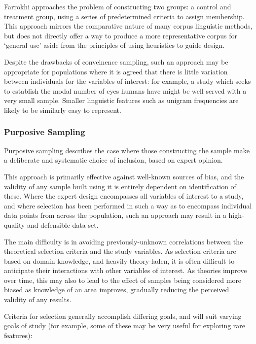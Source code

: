 Farrokhi\cite{farrokhi2012rethinking} approaches the problem of constructing two groups: a control and treatment group, using a series of predetermined criteria to assign membership.  This approach mirrors the comparative nature of many corpus linguistic methods, but does not directly offer a way to produce a more representative corpus for `general use' aside from the principles of using heuristics to guide design.

Despite the drawbacks of conveinence sampling, such an approach may be appropriate for populations where it is agreed that there is little variation between individuals for the variables of interest: for example, a study which seeks to establish the modal number of eyes humans have might be well served with a very small sample.  Smaller linguistic features such as unigram frequencies are likely to be similarly easy to represent.



\subsubsection{Purposive Sampling}
Purposive sampling describes the case where those constructing the sample make a deliberate and systematic choice of inclusion, based on expert opinion.

This approach is primarily effective against well-known sources of bias, and the validity of any sample built using it is entirely dependent on identification of these.  Where the expert design encompasses all variables of interest to a study, and where selection has been performed in such a way as to encompass individual data points from across the population, such an approach may result in a high-quality and defensible data set.

The main difficulty is in avoiding previously-unknown correlations between the theoretical selection criteria and the study variables.  As selection criteria are based on domain knowledge, and heavily theory-laden, it is often difficult to anticipate their interactions with other variables of interest.  As theories improve over time, this may also to lead to the effect of samples being considered more biased as knowledge of an area improves, gradually reducing the perceived validity of any results.

Criteria for selection generally accomplish differing goals, and will suit varying goals of study\cite{advice2000study} (for example, some of these may be very useful for exploring rare features):

